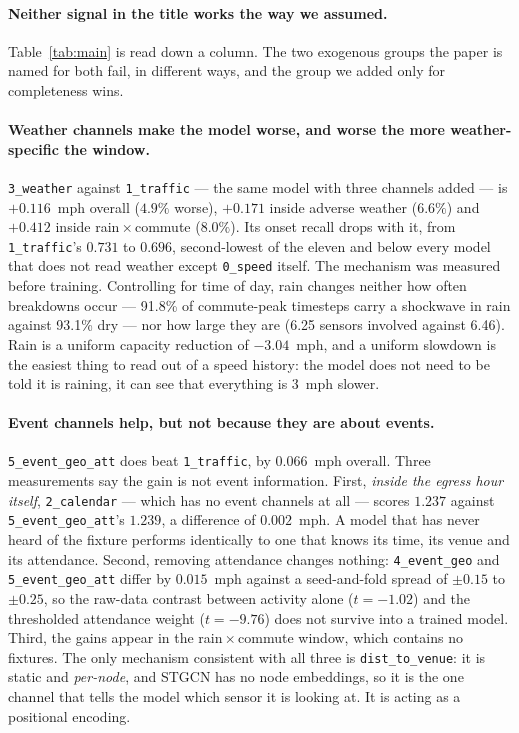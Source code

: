\documentclass[letterpaper]{article}
\begin{document}
\paragraph{Neither signal in the title works the way we assumed.} Table~\ref{tab:main} is read down a column. The two exogenous groups the paper is named for both fail, in different ways, and the group we added only for completeness wins.

\paragraph{Weather channels make the model worse, and worse the more weather-specific the window.} \texttt{3\_weather} against \texttt{1\_traffic} --- the same model with three channels added --- is $+0.116$~mph overall ($4.9\%$ worse), $+0.171$ inside adverse weather ($6.6\%$) and $+0.412$ inside rain\,$\times$\,commute ($8.0\%$). Its onset recall drops with it, from \texttt{1\_traffic}'s $0.731$ to $0.696$, second-lowest of the eleven and below every model that does not read weather except \texttt{0\_speed} itself. The mechanism was measured before training. Controlling for time of day, rain changes neither how often breakdowns occur --- 91.8\% of commute-peak timesteps carry a shockwave in rain against 93.1\% dry --- nor how large they are (6.25 sensors involved against 6.46). Rain is a uniform capacity reduction of $-3.04$~mph, and a uniform slowdown is the easiest thing to read out of a speed history: the model does not need to be told it is raining, it can see that everything is 3~mph slower.

\paragraph{Event channels help, but not because they are about events.} \texttt{5\_event\_geo\_att} does beat \texttt{1\_traffic}, by $0.066$~mph overall. Three measurements say the gain is not event information. First, \emph{inside the egress hour itself}, \texttt{2\_calendar} --- which has no event channels at all --- scores $1.237$ against \texttt{5\_event\_geo\_att}'s $1.239$, a difference of $0.002$~mph. A model that has never heard of the fixture performs identically to one that knows its time, its venue and its attendance. Second, removing attendance changes nothing: \texttt{4\_event\_geo} and \texttt{5\_event\_geo\_att} differ by $0.015$~mph against a seed-and-fold spread of $\pm0.15$ to $\pm0.25$, so the raw-data contrast between activity alone ($t=-1.02$) and the thresholded attendance weight ($t=-9.76$) does not survive into a trained model. Third, the gains appear in the rain\,$\times$\,commute window, which contains no fixtures. The only mechanism consistent with all three is \texttt{dist\_to\_venue}: it is static and \emph{per-node}, and STGCN has no node embeddings, so it is the one channel that tells the model which sensor it is looking at. It is acting as a positional encoding.
\end{document}
